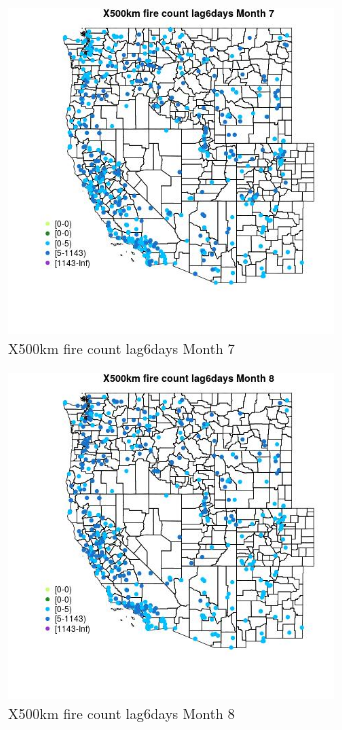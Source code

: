 \begin{figure} 
\centering  
\includegraphics[width=0.77\textwidth]{Code_Outputs/Report_ML_input_PM25_Step4_part_e_de_duplicated_aves_compiled_2019-05-14wNAs_MapObsMo7X500km_fire_count_lag6days.jpg} 
\caption{\label{fig:Report_ML_input_PM25_Step4_part_e_de_duplicated_aves_compiled_2019-05-14wNAsMapObsMo7X500km_fire_count_lag6days}X500km fire count lag6days Month 7} 
\end{figure} 
 

\begin{figure} 
\centering  
\includegraphics[width=0.77\textwidth]{Code_Outputs/Report_ML_input_PM25_Step4_part_e_de_duplicated_aves_compiled_2019-05-14wNAs_MapObsMo8X500km_fire_count_lag6days.jpg} 
\caption{\label{fig:Report_ML_input_PM25_Step4_part_e_de_duplicated_aves_compiled_2019-05-14wNAsMapObsMo8X500km_fire_count_lag6days}X500km fire count lag6days Month 8} 
\end{figure} 
 

